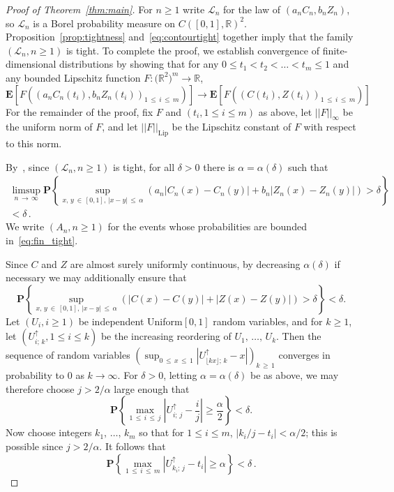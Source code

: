 \documentclass[10pt]{amsart}
\theoremstyle{definition}\newtheorem{defi}[theo]{Definition}\newtheorem{rema}[theo]{Remark}\newtheorem{exam}[theo]{Example}\newtheorem{exem}[theo]{Example}\newtheorem{nota}[theo]{Notation}
\providecommand{\R}{}
\renewcommand{\R}{\mathbb{R}}
\newcommand{\cL}{\mathcal{L}}
\newcommand{\lip}[1]{\ensuremath{|\!|#1|\!|_{\text{Lip}}}}
\newcommand{\ninf}[1]{\ensuremath{|\!|#1|\!|_{\infty}}}
\newcommand{\E}[1]{\mathbf{E}\left[#1\right]}
\newcommand{\p}[1]{\mathbf{P}\left\{#1\right\}}
\newcommand{\limC}{\ensuremath{C}}
\newcommand{\limZ}{\ensuremath{Z}}
\begin{document}
\begin{proof}[Proof of Theorem~\ref{thm:main}]
For $n \ge 1$ write $\cL_n$ for the law of $(a_n C_n,b_nZ_n)$, so $\cL_n$ is a Borel probability measure on $C([0,1],\R)^2$. Proposition~\ref{prop:tightness} and~\eqref{eq:contourtight} together imply that the family $(\cL_n,n \ge 1)$ is tight. To complete the proof, we establish convergence of finite-dimensional distributions by showing that for any $0 \le t_1 < t_2 < \ldots < t_m \le 1$ and any bounded Lipschitz function $F : \big(\R^2\big)^m \rightarrow \R$,
\begin{equation}\label{eq:toprove}
\E{F\left(\left(a_nC_n(t_i),b_nZ_n(t_i)\right)_{1\,\le\,i\,\le\,m}\right)} \to \E{F\left(\left(\limC(t_i),\limZ(t_i)\right)_{1\,\le\,i\,\le\,m}\right)}
\end{equation}
For the remainder of the proof, fix $F$ and $(t_i, 1 \le i \le m)$ as above, let $\ninf{F}$ be the uniform norm of $F$, and let $\lip{F}$ be the Lipschitz constant of $F$ with respect to this norm.

By~\cite[Theorem~8.2]{billingsley}, since $(\cL_n,n \ge 1)$ is tight, for all $\delta > 0$ there is $\alpha=\alpha(\delta)$ such that
\begin{multline}\label{eq:fin_tight}
\limsup_{n\,\to\,\infty} \p{\sup_{x,\,y\: \in\,[0,1],\,|x-y|\,\le\,\alpha} \left(a_n\left|C_n(x)-C_n(y)\right|+b_n\left|Z_n(x)-Z_n(y)\right|\right) > \delta}\\
< \delta\,.
\end{multline}
We write $(A_n,n \ge 1)$ for the events whose probabilities are bounded in~\eqref{eq:fin_tight}.

Since $C$ and $Z$ are almost surely uniformly continuous, by decreasing $\alpha(\delta)$ if necessary we may additionally ensure that
\begin{equation}\label{eq:lim_tight}
\p{\sup_{x,\,y \:\in\,[0,1],\,|x-y|\,\le\,\alpha} \left(\left|C(x)-C(y)\right| + \left|Z(x)-Z(y)\right|\right) > \delta} < \delta.
\end{equation}
Let $(U_i,i \ge 1)$ be independent Uniform$[0,1]$ random variables, and for $k \ge 1$, let $(U_{i;\,k}^\uparrow,1 \le i \le k)$ be the increasing reordering of $U_1,\,\ldots,\,U_k$. Then the sequence of random variables $(\sup_{0\,\le\,x \,\le\,1} |U_{\lfloor kx\rfloor;\,k}^\uparrow-x|)_{k\,\ge\,1}$ converges in probability to $0$ as $k \to \infty$. For $\delta > 0$, letting $\alpha=\alpha(\delta)$ be as above, we may therefore choose $j> 2/\alpha $ large enough that
\[
\p{\max_{1\,\le\,i\,\le\,j} \left| U_{i;\,j}^{\uparrow} - \frac{i}{j} \right| \ge \frac{\alpha}{2}} < \delta.
\]
Now choose integers $k_1,\,\ldots,\,k_m$ so that for $1 \le i \le m$, $|k_i/j-t_i| < \alpha/2$; this is possible since $j > 2/\alpha$. It follows that
\begin{equation}\label{eq:unif_llm}
\p{\max_{1\,\le\,i\,\le\,m} \left|U^\uparrow_{k_i;\,j}-t_i\right| \ge \alpha} < \delta\,.
\end{equation}


\end{proof}
\end{document}

